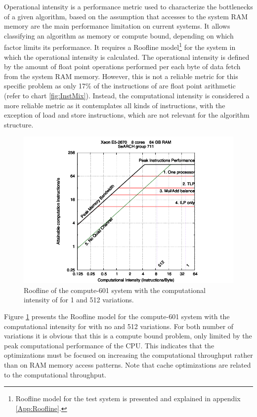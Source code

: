 Operational intensity \cite{Roofline} is a performance metric used to characterize the bottlenecks of a given algorithm, based on the assumption that accesses to the system RAM memory are the main performance limitation on current systems. It allows classifying an algorithm as memory or compute bound, depending on which factor limits its performance. It requires a Roofline model\footnote{Roofline model for the test system is presented and explained in appendix \ref{App:Roofline}.} for the system in which the operational intensity is calculated. The operational intensity is defined by the amount of float point operations performed per each byte of data fetch from the system RAM memory. However, this is not a reliable metric for this specific problem as only 17\% of the instructions of \ttDilepKinFit are float point arithmetic (refer to chart \ref{fig:InstMix}). Instead, the computational intensity is considered a more reliable metric as it contemplates all kinds of instructions, with the exception of load and store instructions, which are not relevant for the algorithm structure.

\begin{figure}[!htp]
	\begin{center}
		\includegraphics[scale=1]{../../common/601_papi.pdf}  
		\caption{Roofline of the compute-601 system with the computational intensity of \ttDilepKinFit for 1 and 512 variations.}
		\label{fig:Roofline}
	\end{center}
\end{figure}

Figure \ref{fig:Roofline} presents the Roofline model for the compute-601 system with the computational intensity for \ttDilepKinFit with no and 512 variations. For both number of variations it is obvious that this is a compute bound problem, only limited by the peak computational performance of the CPU. This indicates that the optimizations must be focused on increasing the computational throughput rather than on RAM memory access patterns. Note that cache optimizations are related to the computational throughput.

